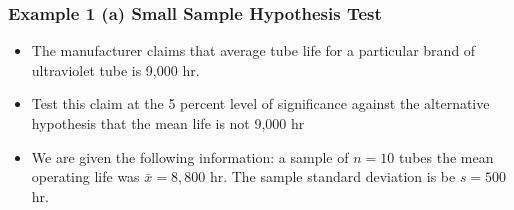 \documentclass[a4]{beamer}
\begin{document}
\begin{frame}
\frametitle{Example 1 (a) Small Sample Hypothesis Test}
\large
\begin{itemize}

\item The manufacturer claims that average tube life for a particular brand of ultraviolet tube
is 9,000 hr. \item Test this claim at the 5 percent level of significance against the alternative hypothesis
that the mean life is not 9,000 hr \item We are given the following information:  a sample of $n = 10$ tubes the mean operating
life was $\bar{x} = 8,800$ hr. The sample standard deviation is be $s = 500$ hr.
\end{itemize}
\end{frame}
\end{document}
